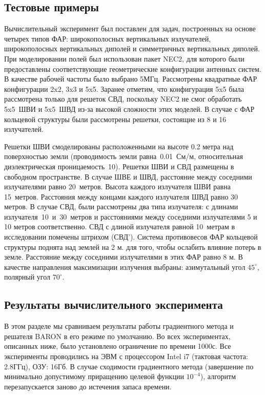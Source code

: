 \subsection{Тестовые примеры}\label{subsec:examples}

Вычислительный эксперимент был поставлен для задач, построенных на основе четырех типов ФАР: широкополосных вертикальных излучателей, широкополосных вертикальных диполей и симметричных вертикальных диполей. При моделировании полей был использован пакет NEC2, для которого были предоставлены соответствующие геометрические конфигурации антенных систем. В качестве рабочей частоты было выбрано 5МГц. Рассмотрены квадратные ФАР конфигурации 2x2, 3x3 и 5x5. Заранее отметим, что конфигурация 5x5 была рассмотрена только для решеток СВД, поскольку NEC2 не смог обработать 5x5~ШВИ и 5x5~ШВД из-за высокой сложности этих моделей. В случае с ФАР кольцевой структуры были рассмотрены решетки, состоящие из 8 и 16 излучателей.

Решетки ШВИ смоделированы расположенными на высоте 0.2 метра над поверхностью земли (проводимость земли равна~0.01~См/м, относительная диэлектрическая проницаемость~10). Решетки ШВИ и СВД размещены в свободном пространстве. В случае ШВЕ и ШВД, расстояние между соседними излучателями равно 20~метров. Высота каждого излучателя ШВИ равна 15~метров. Расстояния между концами каждого излучателя ШВД равно 30 метров. В случае СВД, были рассмотрены два типа излучателя: с длинами излучателя~10~и~30~метров и расстояниями между соседними излучателями 5 и 10 метров соответственно. СВД с длиной излучателя равной 10~метрам в исследовании помечены штрихом (СВД'). Система противовесов ФАР кольцевой структуры поднята над землей на 2 м. для того, чтобы ослабить влияние потерь в земле. Расстояние между соседними излучателями в этих ФАР равно 8 м. В качестве направления максимизации излучения выбраны: азимутальный угол $45^{\circ}$, полярный угол $70^{\circ}$.

\subsection{Результаты вычислительного эксперимента} \label{subsec:results}

В этом разделе мы сравниваем результаты работы градиентного метода и решателя BARON в его режиме по умолчанию. Во всех экспериментах, описанных ниже, было установлено ограничение по времени 1000с. Все эксперименты проводились на ЭВМ с процессором Intel i7 (тактовая частота: 2.8ГГц), ОЗУ: 16Гб. В случае сходимости градиентного метода (завершение по минимально допустимому приращению целевой функции $10^{-4}$), алгоритм перезапускается заново до истечения запаса времени.

